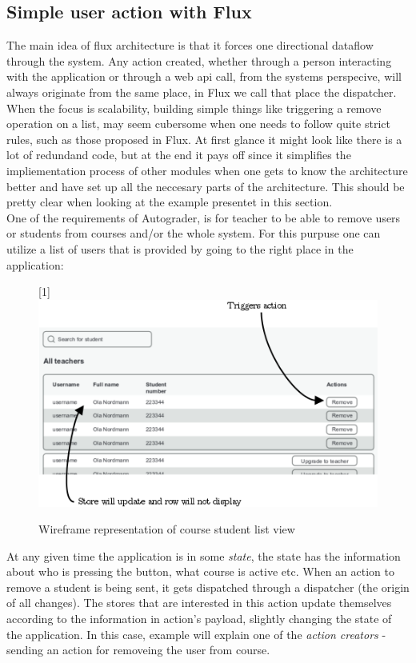 \subsection{Simple user action with Flux}\label{sec:simplefluxexample}
The main idea of flux architecture is that it forces one directional dataflow through the system. Any action created, whether through a person interacting with the application or through a web api call, from the systems perspecive, will always originate from the same place, in Flux we call that place the dispatcher. When the focus is scalability, building simple things like triggering a remove operation on a list, may seem cubersome when one needs to follow quite strict rules, such as those proposed in Flux. At first glance it might look like there is a lot of redundand code, but at the end it pays off since it simplifies the impliementation process of other modules when one gets to know the architecture better and have set up all the neccesary parts of the architecture. This should be pretty clear when looking at the example presentet in this section.
\\One of the requirements of Autograder, is for teacher to be able to remove users or students from courses and/or the whole system. For this purpuse one can utilize a list of users that is provided by going to the right place in the application:
\begin{figure}[h]
  \scalebox{1}[1]{{\includegraphics[width=1\linewidth]{graphics/simpleremoveuser.png}}}
  \caption{Wireframe representation of course student list view}
  \label{fig:simpleremoveuser}
\end{figure}

At any given time the application is in some \emph{state}, the state has the information about who is pressing the button, what course is active etc. When an action to remove a student is being sent, it gets dispatched through a dispatcher (the origin of all changes). The stores that are interested in this action update themselves according to the information in action's payload, slightly changing the state of the application. In this case, example will explain one of the \emph{action creators} - sending an action for removeing the user from course.


